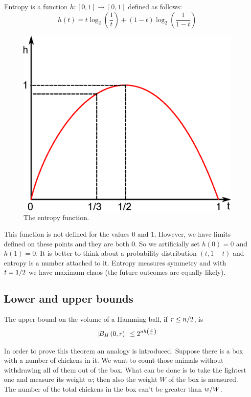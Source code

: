 \begin{definition}
Entropy is a function $h: [0, 1] \rightarrow [0, 1]$ defined as follows:
\begin{equation}
	h(t) = t\log_2(\dfrac{1}{t}) + (1 - t)\log_2\left(\dfrac{1}{1-t}\right)
\end{equation} 
\end{definition}

\begin{figure}[h!]
	\centering
	\includegraphics[width=0.5\linewidth]{pictures/ch01-i00.eps}
	\caption{The entropy function.}
\end{figure}

This function is not defined for the values $0$ and $1$. However, we have limits defined on these points and they are both $0$. So we artificially set $h(0) = 0$ and $h(1) = 0$. It is better to think about a probability distribution $(t, 1 - t)$ and entropy is a number attached to it. Entropy measures symmetry and with $t = {1}/{2}$ we have maximum chaos (the future outcomes are equally likely).

\subsection{Lower and upper bounds}

\begin{thm}
	The upper bound on the volume of a Hamming ball, if $ r \leq {n}/{2}$, is
	$$|B_H\left(0, r\right)| \leq 2^{nh\left(\frac{r}{n}\right)}$$
\end{thm}

In order to prove this theorem an analogy is introduced. Suppose there is a box with a number of chickens in it. We want to count those animals without withdrawing all of them out of the box. What can be done is to take the lightest one and measure its weight $w$; then also the weight $W$ of the box is measured. The number of the total chickens in the box can't be greater than ${w}/{W}$.\\

